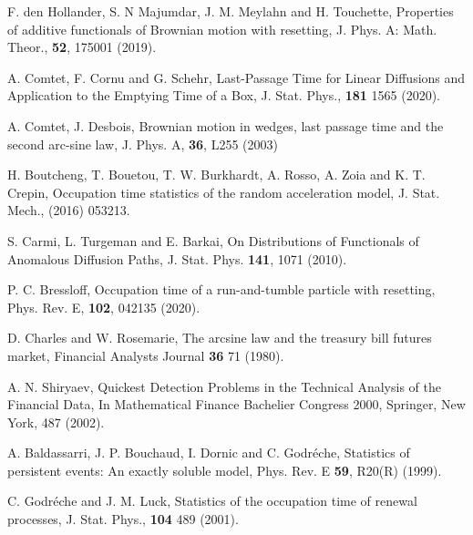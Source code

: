 \documentclass[showpacs,amsmath,amssymb,aps,pre,twocolumn,]{revtex4-1}
\begin{document}
\begin{thebibliography}{}
F. den Hollander, S. N Majumdar, J. M. Meylahn and H. Touchette, Properties of additive functionals of Brownian motion with resetting, J. Phys. A: Math. Theor., \textbf{52}, 175001 (2019).

A. Comtet, F. Cornu and G. Schehr, Last-Passage Time for Linear Diffusions and Application to the Emptying Time of a Box, J. Stat. Phys., \textbf{181} 1565 (2020).


A. Comtet, J. Desbois, Brownian motion in wedges, last passage time and the second arc-sine law, J. Phys. A, \textbf{36}, L255 (2003)





H. Boutcheng, T. Bouetou, T. W. Burkhardt, A. Rosso, A. Zoia and K. T. Crepin, Occupation time statistics of the random acceleration model, J. Stat. Mech., (2016) 053213.



S. Carmi, L. Turgeman  and E. Barkai, On Distributions of Functionals of Anomalous Diffusion Paths, J. Stat. Phys. \textbf{141}, 1071 (2010).


P. C. Bressloff, Occupation time of a run-and-tumble particle with resetting, Phys. Rev. E, \textbf{102}, 042135 (2020).



D. Charles and W. Rosemarie, The arcsine law and the treasury bill futures market, {Financial Analysts Journal} \textbf{36} 71 (1980).

A. N. Shiryaev, Quickest Detection Problems in the Technical Analysis
of the Financial Data, In Mathematical Finance Bachelier Congress 2000, Springer, New York, 487 (2002).




A. Baldassarri, J. P. Bouchaud, I. Dornic and C. Godr\'{e}che, Statistics of persistent events: An exactly soluble model, {Phys. Rev. E} \textbf{59}, R20(R) (1999).


C. Godr\'{e}che and J. M. Luck, Statistics of the occupation time of renewal processes, J. Stat. Phys., \textbf{104} 489 (2001).



\end{thebibliography}
\end{document}
